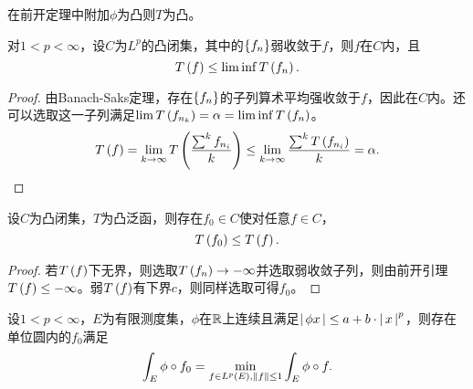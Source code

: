 \documentclass{ctexrep}
\begin{document}
  \begin{ex}
  在前开定理中附加$\phi$为凸则$T$为凸。
  \end{ex}
  \begin{lemma}
  对$1<p<\infty$，设$C$为$L^p$的凸闭集，其中的$\left\{f_n\right\}$弱收敛于$f$，则$f$在$C$内，且
  \[ T\left(f\right) \le \lim\inf T\left(f_n\right). \]
  \end{lemma}
  \begin{proof}
  由Banach-Saks定理，存在$\left\{f_n\right\}$的子列算术平均强收敛于$f$，因此在$C$内。还可以选取这一子列满足$\lim T\left(f_{n_k}\right) = \alpha = \lim\inf T\left(f_n\right)$。
  \[ T\left(f\right) = \lim_{k\rightarrow \infty} T\left(\frac{\sum^k f_{n_i}}{k}\right) \le \lim_{k\rightarrow \infty}\frac{\sum^k T\left(f_{n_i}\right)}{k} = \alpha. \qedhere\]
  \end{proof}
  \begin{theorem}
  设$C$为凸闭集，$T$为凸泛函，则存在$f_0\in C$使对任意$f\in C$，
  \[ T\left(f_0\right)\le T\left(f\right). \]
  \end{theorem}
  \begin{proof}
  若$T\left(f\right)$下无界，则选取$T\left(f_n\right)\rightarrow -\infty$并选取弱收敛子列，则由前开引理$T\left(f\right) \le -\infty$。弱$T\left(f\right)$有下界$c$，则同样选取可得$f_0$。
  \end{proof}
  \begin{collary}
  设$1<p<\infty$，$E$为有限测度集，$\phi$在$\mathbb{R}$上连续且满足$\left|\, \phi{x} \,\right| \le a+b\cdot\left|\, x \,\right|^p$，则存在单位圆内的$f_0$满足
  \[ \int_E \phi\circ f_0 = \min_{f\in L^p\left(E\right), \left\| f \right\|\le 1} \int_E \phi\circ f. \]
  \end{collary}
 
\ifx\allfiles\undefined %
\end{document}
